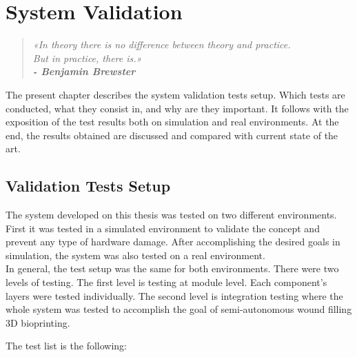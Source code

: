 \chapter{System Validation}
\label{cha:system_validation}

\begin{quotation}
\begin{flushright}
\itshape
«In theory there is no difference between theory and practice.\\ But in practice, there is.»\\
\textbf{- Benjamin Brewster}
\end{flushright}
\end{quotation}

The present chapter describes the system validation tests setup. Which tests are conducted, what they consist in, and why are they important. It follows with the exposition of the test results both on simulation and real environments. At the end, the results obtained are discussed and compared with current state of the art.


\section{Validation Tests Setup}
\label{sec:system_validation_tests_setup}

The system developed on this thesis was tested on two different environments. First it was tested in a simulated environment to validate the concept and prevent any type of hardware damage. After accomplishing the desired goals in simulation, the system was also tested on a real environment.\\

In general, the test setup was the same for both environments. There were two levels of testing. The first level is testing at module level. Each component's layers were tested individually. The second level is integration testing where the whole system was tested to accomplish the goal of semi-autonomous wound filling 3D bioprinting.

The test list is the following:

